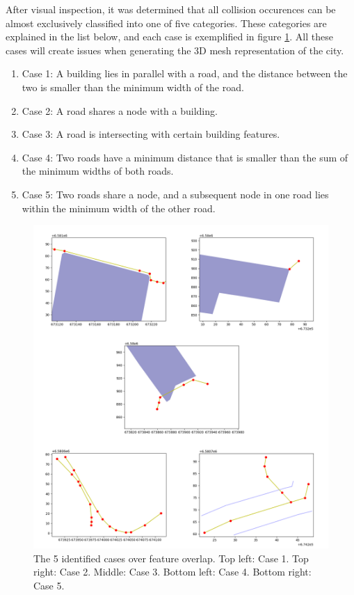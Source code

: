 \documentclass{kththesis}
\begin{document}
After visual inspection, it was determined that all collision occurences can be almost exclusively classified into one of five categories.
These categories are explained in the list below, and each case is exemplified in figure \ref{fig:collision-cases}.
All these cases will create issues when generating the 3D mesh representation of the city.

\begin{enumerate}
\item Case 1: A building lies in parallel with a road, and the distance between the two is smaller than the minimum width of the road.
\item Case 2: A road shares a node with a building.
\item Case 3: A road is intersecting with certain building features.
\item Case 4: Two roads have a minimum distance that is smaller than the sum of the minimum widths of both roads. 
\item Case 5: Two roads share a node, and a subsequent node in one road lies within the minimum width of the other road.
\end{enumerate}

\begin{figure}[H]
    \centering
    \includegraphics[width=\textwidth,height=0.5\textheight,keepaspectratio]{img_feature_overlap_cases}
    \caption{The 5 identified cases over feature overlap. Top left: Case 1. Top right: Case 2. Middle: Case 3. Bottom left: Case 4. Bottom right: Case 5.}
    \label{fig:collision-cases}
\end{figure}
\end{document}
